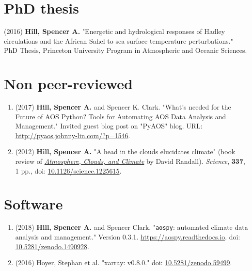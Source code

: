 \documentclass[12pt,letterpaper]{shillcv}
\begin{document}
\section*{PhD thesis}
\label{sec:org4ddfa95}
(2016) \textbf{Hill, Spencer A.} "Energetic and hydrological responses of Hadley
circulations and the African Sahel to sea surface temperature perturbations."
PhD Thesis, Princeton University Program in Atmospheric and Oceanic Sciences.
\section*{Non peer-reviewed}
\label{sec:orgfc75d1f}
\begin{enumerate}
\item (2017) \textbf{Hill, Spencer A.} and Spencer K. Clark.  "What’s needed for the Future
of AOS Python? Tools for Automating AOS Data Analysis and Management."
Invited guest blog post on "PyAOS" blog.  URL:
\url{http://pyaos.johnny-lin.com/?p=1546}.
\item (2012) \textbf{Hill, Spencer A.}  "A head in the clouds elucidates climate" (book
review of \href{http://press.princeton.edu/titles/9773.html}{\emph{Atmosphere, Clouds, and Climate}} by David Randall). \emph{Science}, \textbf{337},
1 pp., doi: \href{http://dx.doi.org/10.1126/science.1225615}{10.1126/science.1225615}.
\end{enumerate}
\section*{Software}
\label{sec:orgc5865ae}
\begin{enumerate}
\item (2018) \textbf{Hill, Spencer A.} and Spencer Clark.  "\texttt{aospy}: automated climate
data analysis and management."  Version 0.3.1.  \url{https://aospy.readthedocs.io}.
doi: \href{https://doi.org/10.5281/zenodo.1490928}{10.5281/zenodo.1490928}.
\item (2016) Hoyer, Stephan et al.  "xarray: v0.8.0."  doi: \href{https://doi.org/10.5281/zenodo.59499}{10.5281/zenodo.59499}.
\end{enumerate}
\end{document}
